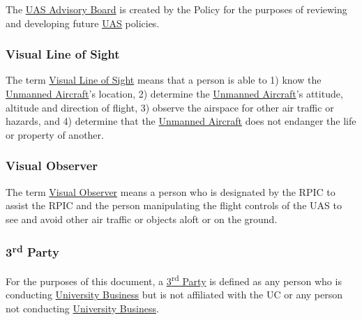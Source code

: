 \documentclass[
]{book}
\begin{document}
The \protect\hyperlink{AB}{UAS Advisory Board} is created by the Policy for the purposes of reviewing and developing future \protect\hyperlink{UAS}{UAS} policies.



\hypertarget{VLOS}{%
\subsubsection*{Visual Line of Sight}\label{VLOS}}

The term \protect\hyperlink{VLOS}{Visual Line of Sight} means that a person is able to 1) know the \protect\hyperlink{UA}{Unmanned Aircraft}'s location, 2) determine the \protect\hyperlink{UA}{Unmanned Aircraft}'s attitude, altitude and direction of flight, 3) observe the airspace for other air traffic or hazards, and 4) determine that the \protect\hyperlink{UA}{Unmanned Aircraft} does not endanger the life or property of another.





\hypertarget{VO}{%
\subsubsection*{Visual Observer}\label{VO}}

The term \protect\hyperlink{VO}{Visual Observer} means a person who is designated by the RPIC to assist the RPIC and the person manipulating the flight controls of the UAS to see and avoid other air traffic or objects aloft or on the ground.





\hypertarget{rdparty}{%
\subsubsection*{\texorpdfstring{3\textsuperscript{rd} Party}{3rd Party}}\label{rdparty}}

For the purposes of this document, a \protect\hyperlink{rdparty}{3\textsuperscript{rd} Party} is defined as any person who is conducting \protect\hyperlink{UB}{University Business} but is not affiliated with the UC or any person not conducting \protect\hyperlink{UB}{University Business}.



  
\end{document}
